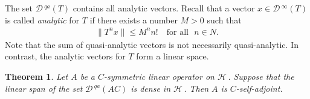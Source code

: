 \documentclass[12pt]{amsart}
\newtheorem{thm}{Theorem}
\theoremstyle{definition}
\newcommand{\cD}{\mathcal{D}\,}
\newcommand{\cH}{\mathcal{H}\,}
\begin{document}
The set $\cD^{qa}(T)$ contains all analytic vectors. Recall that a vector $x\in \cD^\infty (T)$ is called \emph{analytic} for $T$ if there exists a number $M>0$ such that
\begin{align*} %
\| T^n x\|\leq M^n n!\quad \textrm{for all}~~~ n\in N.
\end{align*}
Note that the sum of quasi-analytic vectors is not necessarily quasi-analytic.   In contrast, the analytic vectors for $T$ form a linear space.
\begin{thm}\label{thquasianalytic} Let $A$ be a $C$-symmetric linear operator on $\cH$. Suppose  that the linear span of the set  $\cD^{qa}(AC)$ is dense in $\cH$. Then $A$ is $C$-self-adjoint.
\end{thm}
\end{document}
